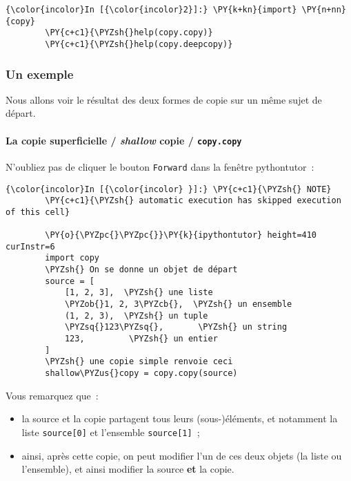     \begin{Verbatim}[commandchars=\\\{\}]
{\color{incolor}In [{\color{incolor}2}]:} \PY{k+kn}{import} \PY{n+nn}{copy}
        \PY{c+c1}{\PYZsh{}help(copy.copy)}
        \PY{c+c1}{\PYZsh{}help(copy.deepcopy)}
\end{Verbatim}


    \hypertarget{un-exemple}{%
\subsubsection{Un exemple}\label{un-exemple}}

    Nous allons voir le résultat des deux formes de copie sur un même sujet
de départ.

    \hypertarget{la-copie-superficielle-shallow-copie-copy.copy}{%
\paragraph{\texorpdfstring{La copie superficielle / \emph{shallow} copie
/
\texttt{copy.copy}}{La copie superficielle / shallow copie / copy.copy}}\label{la-copie-superficielle-shallow-copie-copy.copy}}

    N'oubliez pas de cliquer le bouton \texttt{Forward} dans la fenêtre
pythontutor~:

    \begin{Verbatim}[commandchars=\\\{\}]
{\color{incolor}In [{\color{incolor} }]:} \PY{c+c1}{\PYZsh{} NOTE}
        \PY{c+c1}{\PYZsh{} automatic execution has skipped execution of this cell}
        
        \PY{o}{\PYZpc{}\PYZpc{}}\PY{k}{ipythontutor} height=410 curInstr=6
        import copy
        \PYZsh{} On se donne un objet de départ
        source = [
            [1, 2, 3],  \PYZsh{} une liste
            \PYZob{}1, 2, 3\PYZcb{},  \PYZsh{} un ensemble
            (1, 2, 3),  \PYZsh{} un tuple
            \PYZsq{}123\PYZsq{},       \PYZsh{} un string
            123,         \PYZsh{} un entier
        ]
        \PYZsh{} une copie simple renvoie ceci
        shallow\PYZus{}copy = copy.copy(source)
\end{Verbatim}


    Vous remarquez que~:

\begin{itemize}
\tightlist
\item
  la source et la copie partagent tous leurs (sous-)éléments, et
  notamment la liste \texttt{source{[}0{]}} et l'ensemble
  \texttt{source{[}1{]}}~;
\item
  ainsi, après cette copie, on peut modifier l'un de ces deux objets (la
  liste ou l'ensemble), et ainsi modifier la source \textbf{et} la
  copie.
\end{itemize}


